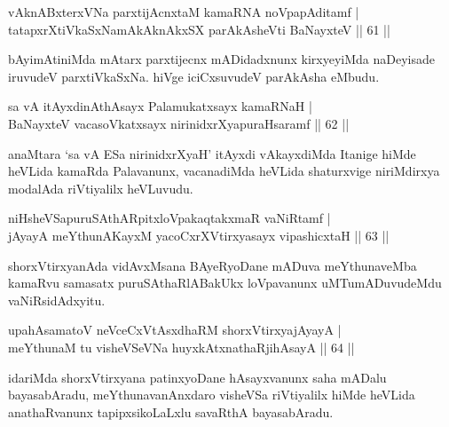
\begin{shl}
vAknABxterxVNa parxtijAcnxtaM kamaRNA noVpapAditamf | \\
tatapxrXtiVkaSxNamAkAknAkxSX parAkAsheVti BaNayxteV \hfill|| 61 || 
\end{shl}

\begin{artha}
bAyimAtiniMda mAtarx parxtijecnx mADidadxnunx kirxyeyiMda naDeyisade 
iruvudeV parxtiVkaSxNa. hiVge iciCxsuvudeV parAkAsha eMbudu.
\end{artha}


\begin{shl}
sa vA itAyxdinA\s thAsayx Palamukatxsayx kamaRNaH | \\
BaNayxteV vacasoVkatxsayx nirinidxrXyapuraHsaramf \hfill|| 62 || 
\end{shl}

\begin{artha}
anaMtara `sa vA ESa nirinidxrXyaH' itAyxdi vAkayxdiMda Itanige hiMde 
heVLida kamaRda Palavanunx, vacanadiMda heVLida shaturxvige 
niriMdirxya modalAda riVtiyalilx heVLuvudu.
\end{artha}


\begin{shl}
niHsheVSapuruSAthARpitxloVpakaqtakxmaR vaNiRtamf | \\
jAyayA meYthunAKayxM yacoCxrXVtirxyasayx vipashicxtaH \hfill|| 63 || 
\end{shl}

\begin{artha}
shorxVtirxyanAda vidAvxMsana BAyeRyoDane mADuva meYthunaveMba kamaRvu samasatx puruSAthaRlABakUkx loVpavanunx uMTumADuvudeMdu vaNiRsidAdxyitu.
\end{artha}

\begin{shl}
upahAsamatoV neVceCxVtAsxdhaRM shorxVtirxyajAyayA | \\
meYthunaM tu visheVSeVNa huyxkAtxnathaRjihAsayA \hfill|| 64 || 
\end{shl}

\begin{artha}
idariMda shorxVtirxyana patinxyoDane hAsayxvanunx saha mADalu bayasabAradu, meYthunavanAnxdaro visheVSa riVtiyalilx hiMde heVLida anathaRvanunx tapipxsikoLaLxlu savaRthA bayasabAradu.
\end{artha}

